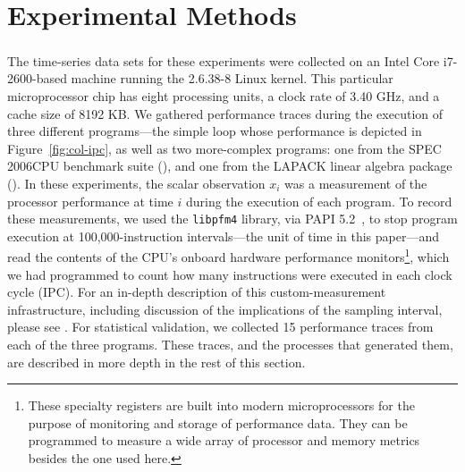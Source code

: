 \section{Experimental Methods}\label{sec:methods}



The time-series data sets for these experiments were collected on an
Intel Core\textsuperscript{\textregistered} i7-2600-based machine
running the 2.6.38-8 Linux kernel.  This particular microprocessor
chip has eight processing units, a clock rate of 3.40 GHz, and a cache
size of 8192 KB.  We gathered performance traces during the execution
of three different programs---the simple \col loop whose performance
is depicted in Figure~\ref{fig:col-ipc}, as well as two more-complex
programs: one from the SPEC 2006CPU benchmark suite (\gcc), and one
from the LAPACK linear algebra package (\svd).  In these experiments,
the scalar observation $x_i$ was a measurement of the processor
performance at time $i$ during the execution of each program.  To
record these measurements, we used the {\tt libpfm4} library, via PAPI
% 
% 
5.2~\cite{papi}, to stop program execution at 100,000-instruction
intervals---the unit of time in this paper---and read the contents of
the CPU's onboard hardware performance monitors\footnote{These
  specialty registers are built into modern microprocessors for the
  purpose of monitoring and storage of performance data.  They can be
  programmed to measure a wide array of processor and memory metrics
  besides the one used here.}, which we had programmed to count how
many instructions were executed in each clock cycle (IPC).  For an
in-depth description of this custom-measurement infrastructure,
including discussion of the implications of the sampling interval,
please see \cite{zach-IDA10,mytkowicz09,todd-phd}.  For statistical
validation, we collected 15 performance traces from each of the three
programs.  These traces, and the processes that generated them, are
described in more depth in the rest of this section.



